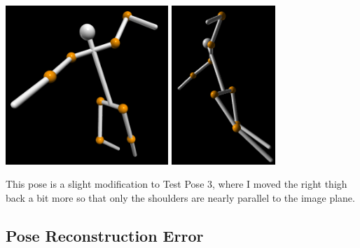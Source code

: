 \documentclass[final]{article}
\begin{document}
\begin{spacing}{1.1}
\begin{center}
  \includegraphics[height=6cm]{fig/testpose4.png}
  \includegraphics[height=6cm]{fig/testposeside4.png}
\end{center}

This pose is a slight modification to Test Pose 3, where I moved the right thigh back a bit more so that only the shoulders are nearly parallel to the image plane.

\subsection{Pose Reconstruction Error}


\end{spacing}
\end{document}
